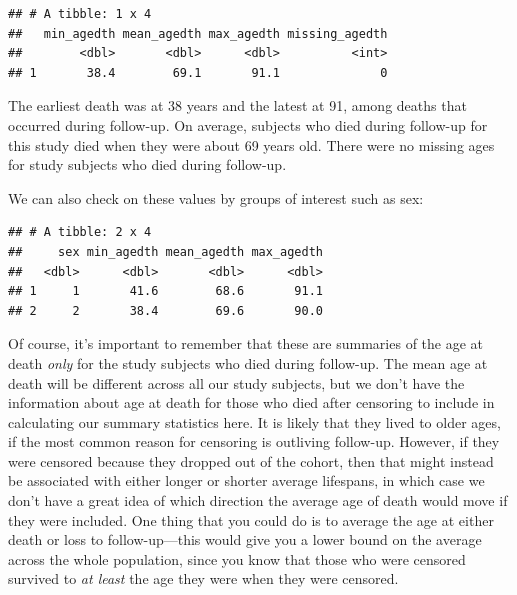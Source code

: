 \documentclass[
]{book}
\newenvironment{Shaded}{\begin{snugshade}}{\end{snugshade}}
\newcommand{\DataTypeTok}[1]{\textcolor[rgb]{0.13,0.29,0.53}{#1}}
\newcommand{\DecValTok}[1]{\textcolor[rgb]{0.00,0.00,0.81}{#1}}
\newcommand{\KeywordTok}[1]{\textcolor[rgb]{0.13,0.29,0.53}{\textbf{#1}}}
\newcommand{\NormalTok}[1]{#1}
\newcommand{\OperatorTok}[1]{\textcolor[rgb]{0.81,0.36,0.00}{\textbf{#1}}}
\newcommand{\StringTok}[1]{\textcolor[rgb]{0.31,0.60,0.02}{#1}}
\begin{document}
\begin{verbatim}
## # A tibble: 1 x 4
##   min_agedth mean_agedth max_agedth missing_agedth
##        <dbl>       <dbl>      <dbl>          <int>
## 1       38.4        69.1       91.1              0
\end{verbatim}

The earliest death was at 38 years and the latest at 91, among deaths that occurred during follow-up. On average, subjects who died during follow-up for this study died when they were about 69 years old. There were no missing ages for study subjects who died during follow-up.

We can also check on these values by groups of interest such as sex:

\begin{Shaded}
\end{Shaded}

\begin{verbatim}
## # A tibble: 2 x 4
##     sex min_agedth mean_agedth max_agedth
##   <dbl>      <dbl>       <dbl>      <dbl>
## 1     1       41.6        68.6       91.1
## 2     2       38.4        69.6       90.0
\end{verbatim}

Of course, it's important to remember that these are summaries of the age at death \emph{only} for the study subjects who died during follow-up. The mean age at death will be different across all our study subjects, but we don't have the information about age at death for those who died after censoring to include in calculating our summary statistics here. It is likely that they lived to older ages, if the most common reason for censoring is outliving follow-up. However, if they were censored because they dropped out of the cohort, then that might instead be associated with either longer or shorter average lifespans, in which case we don't have a great idea of which direction the average age of death would move if they were included. One thing that you could do is to average the age at either death or loss to follow-up---this would give you a lower bound on the average across the whole population, since you know that those who were censored survived to \emph{at least} the age they were when they were censored.
\end{document}
